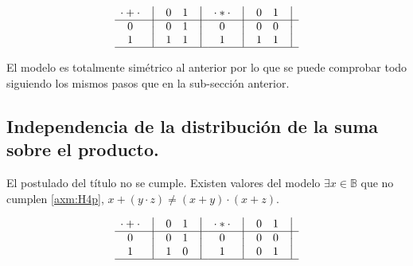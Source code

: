 \documentclass[final,12pt,a4paper,twoside,fleqn]{extbook}
\newcommand{\setB}{\ensuremath{\mathbb{B}}}
\theoremstyle{definition}
\theoremstyle{remark}
\begin{document}
\begin{equation}
    \begin{matrix}
        {\cdot + \cdot} & \big{\vert} & {0} & {1} & \big{\vert} \\
        \hline
        {0}             & \big{\vert} & {0} & {1} & \big{\vert} \\
        {1}             & \big{\vert} & {1} & {1} & \big{\vert} \\
        \hline
    \end{matrix}
    \quad
    \begin{matrix}
        {\cdot * \cdot} & \big{\vert} & {0} & {1} & \big{\vert} \\
        \hline
        {0}                   & \big{\vert} & {0} & {0} & \big{\vert} \\
        {1}                   & \big{\vert} & {1} & {1} & \big{\vert} \\
        \hline
    \end{matrix}
\end{equation}



	El modelo es totalmente simétrico al anterior por lo que se puede
comprobar todo siguiendo los mismos pasos que en la sub-sección anterior.



\subsection{Independencia de la distribución de la suma sobre el producto.}



	El postulado del título no se cumple. Existen valores del modelo \(
\exists x \in \setB \) que no cumplen \ref{axm:H4p}, \( x + ( y \cdot z )
\neq ( x + y ) \cdot (x + z) \).



\begin{equation}
    \begin{matrix}
        {\cdot + \cdot} & \big{\vert} & {0} & {1} & \big{\vert} \\
        \hline
        {0}             & \big{\vert} & {0} & {1} & \big{\vert} \\
        {1}             & \big{\vert} & {1} & {0} & \big{\vert} \\
        \hline
    \end{matrix}
    \quad
    \begin{matrix}
        {\cdot * \cdot} & \big{\vert} & {0} & {1} & \big{\vert} \\
        \hline
        {0}                   & \big{\vert} & {0} & {0} & \big{\vert} \\
        {1}                   & \big{\vert} & {0} & {1} & \big{\vert} \\
        \hline
    \end{matrix}
\end{equation}
\end{document}
